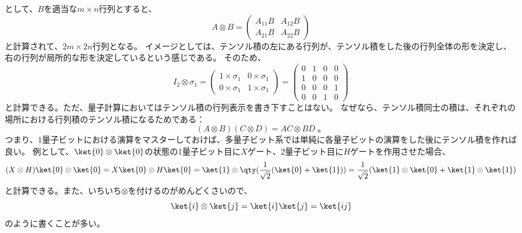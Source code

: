 \documentclass[a4paper,11pt,uplatex]{jsarticle}%
\begin{document}
として、$B$を適当な$m\times n$行列とすると、
\begin{equation}
  A\otimes B  = 
  \begin{pmatrix}
    A_{11}B & A_{12}B \\
    A_{21}B &  A_{22}B 
  \end{pmatrix}
\end{equation}
と計算されて、$2m\times2n$行列となる。
イメージとしては、テンソル積の左にある行列が、テンソル積をした後の行列全体の形を決定し、右の行列が局所的な形を決定しているという感じである。
そのため、
\begin{equation}
  I_{2}\otimes\sigma_1 = 
  \begin{pmatrix}
    1\times\sigma_1 & 0\times\sigma_1 \\
    0\times\sigma_1 & 1\times\sigma_1
  \end{pmatrix}
  =
  \begin{pmatrix}
    0 & 1 & 0 & 0 \\
    1 & 0 & 0 & 0 \\
    0 & 0 & 0 & 1 \\
    0 & 0 & 1 & 0
  \end{pmatrix}
\end{equation}
と計算できる。ただ、量子計算においてはテンソル積の行列表示を書き下すことはない。
なぜなら、テンソル積同士の積は、それぞれの場所における行列積のテンソル積になるためである：
\begin{equation}
  (A\otimes B)(C\otimes D) = AC\otimes BD\;。
\end{equation}
つまり、1量子ビットにおける演算をマスターしておけば、多量子ビット系では単純に各量子ビットの演算をした後にテンソル積を作れば良い。
例として、$\ket{0}\otimes\ket{0}$の状態の1量子ビット目に$X$ゲート、2量子ビット目に$H$ゲートを作用させた場合、
\begin{equation}
  (X\otimes H)\ket{0}\otimes\ket{0} = X\ket{0}\otimes H\ket{0} = \ket{1}\otimes\qty(\frac{1}{\sqrt{2}}(\ket{0}+\ket{1})) = \frac{1}{\sqrt{2}}(\ket{1}\otimes\ket{0}+\ket{1}\otimes\ket{1})
\end{equation}
と計算できる。また、いちいち$\otimes$を付けるのがめんどくさいので、
\begin{equation}
  \ket{i}\otimes\ket{j} = \ket{i}\ket{j}=\ket{ij}
\end{equation}
のように書くことが多い。
\end{document}

